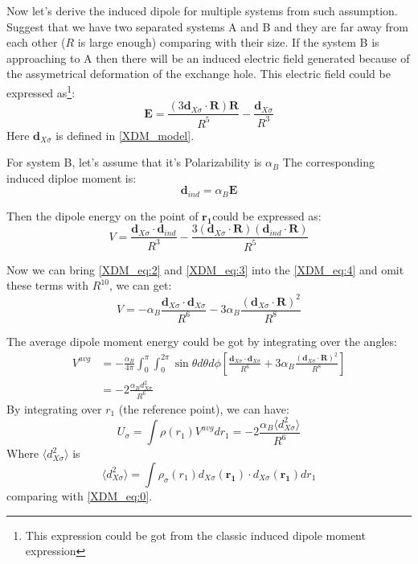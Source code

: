 Now let's derive the induced dipole for multiple systems from such assumption. 
Suggest that we have two  separated systems A and B and they are far away from 
each other ($R$ is large enough)
comparing with their size. If the system B is approaching to A then there will be
an induced electric field generated because of the assymetrical deformation of the 
exchange hole. This electric field could be expressed as\footnote{This expression 
could be got from the classic induced dipole moment expression}:
\begin{equation}
 \label{XDM_eq:2}
\bm{E} = \frac{(3\bm{d}_{X\sigma}\cdot \bm{R})\bm{R}}{R^{5}} - 
\frac{\bm{d}_{X\sigma}}{R^{3}}
\end{equation}
Here $\bm{d}_{X\sigma}$ is defined in \ref{XDM_model}.

For system B, let's assume that it's Polarizability is $\alpha_{B}$ The corresponding 
induced diploe moment is:
\begin{equation}
\label{XDM_eq:3}
 \bm{d}_{ind} = \alpha_{B} \bm{E}
\end{equation}

Then the dipole energy on the point of $\bm{r_{1}}$could be expressed as:
\begin{equation}
 \label{XDM_eq:4}
V = \frac{\bm{d}_{X\sigma}\cdotp \bm{d}_{ind}}{R^{3}} - 
\frac{3 (\bm{d}_{X\sigma}\cdotp \bm{R})(\bm{d}_{ind}\cdotp \bm{R})}{R^{5}}
\end{equation}

Now we can bring \ref{XDM_eq:2} and \ref{XDM_eq:3} into the \ref{XDM_eq:4} and omit
these terms with $R^{10}$, we can get:
\begin{equation}
 \label{XDM_eq:5}
 V= -\alpha_{B}\frac{\bm{d}_{X\sigma}\cdotp \bm{d}_{X\sigma}}{R^{6}}
-3\alpha_{B}\frac{(\bm{d}_{X\sigma}\cdotp \bm{R})^{2}}{R^{8}}
\end{equation}
 
The average dipole moment energy could be got by integrating over the angles:
\begin{align}
\label{XDM_eq:6}
 V^{avg} &= -\frac{\alpha_{B}}{4\pi}\int^{\pi}_{0} \int^{2\pi}_{0} \sin\theta d\theta d\phi 
\left[ \frac{\bm{d}_{X\sigma}\cdotp \bm{d}_{X\sigma}}{R^{6}}
+3\alpha_{B}\frac{(\bm{d}_{X\sigma}\cdotp \bm{R})^{2}}{R^{8}}\right]   \nonumber \\
&= -2\frac{\alpha_{B}d_{X\sigma}^{2}}{R^{6}}
\end{align}
By integrating over $r_{1}$ (the reference point), we can have:
\begin{equation}
\label{XDM_eq:7}
 U_{\sigma} = \int \rho(r_{1}) V^{avg} dr_{1} = 
-2\frac{\alpha_{B}\langle d_{X\sigma}^{2}\rangle}{R^{6}}
\end{equation}
Where $\langle d_{X\sigma}^{2}\rangle$ is
 \begin{equation}
 \langle d_{X\sigma}^{2}\rangle = \int \rho_{\sigma}(r_{1})d_{X\sigma}(\bm{r_{1}})\cdotp 
d_{X\sigma}(\bm{r_{1}}) dr_{1}
\end{equation}
comparing with \ref{XDM_eq:0}.

